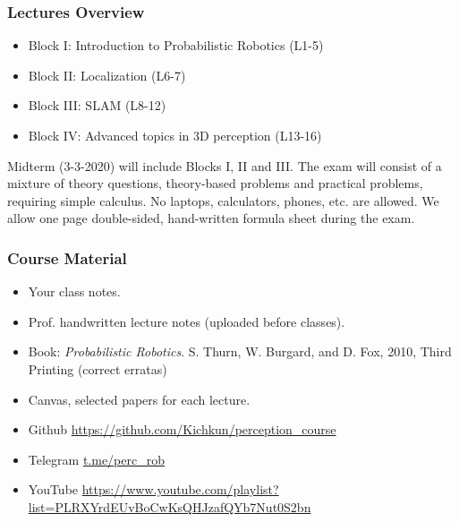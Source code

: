 \documentclass[xetex,mathserif,serif]{beamer} %
\begin{document}
\begin{frame}
\frametitle{Lectures Overview}


\begin{itemize}
\item Block I: Introduction to Probabilistic Robotics (L1-5)
\item Block II: Localization (L6-7)
\item Block III: SLAM (L8-12)
\item Block IV: Advanced topics in 3D perception (L13-16)
\end{itemize}

\pause
\vspace{5mm}
Midterm (3-3-2020) will include Blocks I, II and III. The exam will consist of a mixture of theory questions, theory-based problems and practical problems, requiring simple calculus. No laptops, calculators, phones, etc. are allowed. We allow one page double-sided, hand-written formula sheet during the exam.

\end{frame}

\begin{frame}
\frametitle{Course Material}

\begin{itemize}
\item Your class notes.
\item Prof. handwritten lecture notes (uploaded before classes).
\item Book: {\em Probabilistic Robotics}.
S. Thurn, W. Burgard, and D. Fox, 2010, Third Printing (correct erratas)
\item Canvas, selected papers for each lecture.
\item Github {\small\url{https://github.com/Kichkun/perception_course}}
\item Telegram \url{t.me/perc_rob}
\item YouTube {\small \url{https://www.youtube.com/playlist?list=PLRXYrdEUvBoCwKsQHJzafQYb7Nut0S2bn}}
\end{itemize}

\end{frame}
\end{document}
